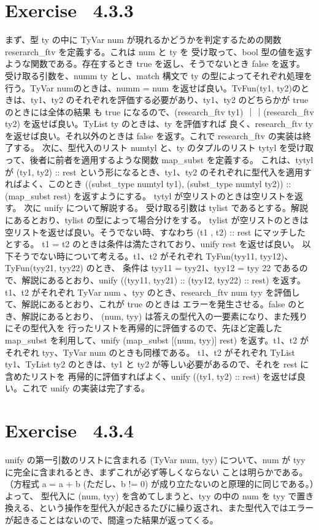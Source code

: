 \documentclass{jreport}
\begin{document}
\section{Exercise \ 4.3.3}
まず、型 ty の中に TyVar num が現れるかどうかを判定するための関数 reserarch\_ftv を定義する。これは num と ty を
受け取って、bool 型の値を返すような関数である。存在するとき true を返し、そうでないとき false を返す。
受け取る引数を、numm ty とし、match 構文で ty の型によってそれぞれ処理を行う。TyVar numのときは、numm = num を返せば良い。TvFun(ty1, ty2)のときは、ty1、ty2 のそれぞれを評価する必要があり、ty1、ty2 のどちらかが true のときには全体の結果
も true になるので、(research\_ftv ty1) ｜｜(research\_ftv ty2) を返せば良い。TyList ty のときは、ty を評価すれば
良く、research\_ftv ty を返せば良い。それ以外のときは false を返す。これで research\_ftv の実装は終了する。
次に、型代入のリスト numtyl と、ty のタプルのリスト tytyl を受け取って、後者に前者を適用するような関数 map\_subst を定義する。
これは、tytyl が (ty1, ty2) :: rest という形になるとき、ty1、ty2 のそれぞれに型代入を適用すればよく、このとき
((subst\_type numtyl ty1), (subst\_type numtyl ty2)) :: (map\_subst rest) を返すようにする。
 tytyl が空リストのときは空リストを返す。
次に unify について解説する。
受け取る引数は tylist であるとする。解説にあるとおり、tylist の型によって場合分けをする。
tylist が空リストのときは空リストを返せば良い。そうでない時、すなわち (t1 , t2) :: rest にマッチしたとする。
t1 = t2 のときは条件は満たされており、unify rest を返せば良い。
以下そうでない時について考える。t1、t2 がそれぞれ TyFun(tyy11, tyy12)、TyFun(tyy21, tyy22) のとき、
条件は tyy11 = tyy21、tyy12 = tyy 22 であるので、解説にあるとおり、unify ((tyy11, tyy21) :: (tyy12, tyy22) :: rest)
を返す。
t1、t2 がそれぞれ TyVar num 、tyy のとき、research\_ftv num tyy を評価して、解説にあるとおり、これが true のときは
エラーを発生させる。false のとき、解説にあるとおり、 (num, tyy) は答えの型代入の一要素になり、また残りにその型代入を
行ったリストを再帰的に評価するので、先ほど定義した map\_subst を利用して、unify (map\_subst [(num, tyy)] rest)
を返す。t1、t2 がそれぞれ tyy、TyVar num のときも同様である。
t1、t2 がそれぞれ TyList ty1、TyList ty2 のときは、ty1 と ty2 が等しい必要があるので、それを rest に含めたリストを
再帰的に評価すればよく、unify ((ty1, ty2) :: rest) を返せば良い。これで unify の実装は完了する。
\section{Exercise \ 4.3.4}
unify の第一引数のリストに含まれる (TyVar num, tyy) について、num が tyy に完全に含まれるとき、まずこれが必ず等しくならない
ことは明らかである。（方程式 a = a + b (ただし、b != 0) が成り立たないのと原理的に同じである。）よって、
型代入に (num, tyy) を含めてしまうと、tyy の中の num を tyy で置き換える、という操作を型代入が起きるたびに繰り返され、また型代入ではエラーが起きることはないので、間違った結果が返ってくる。
\end{document}
